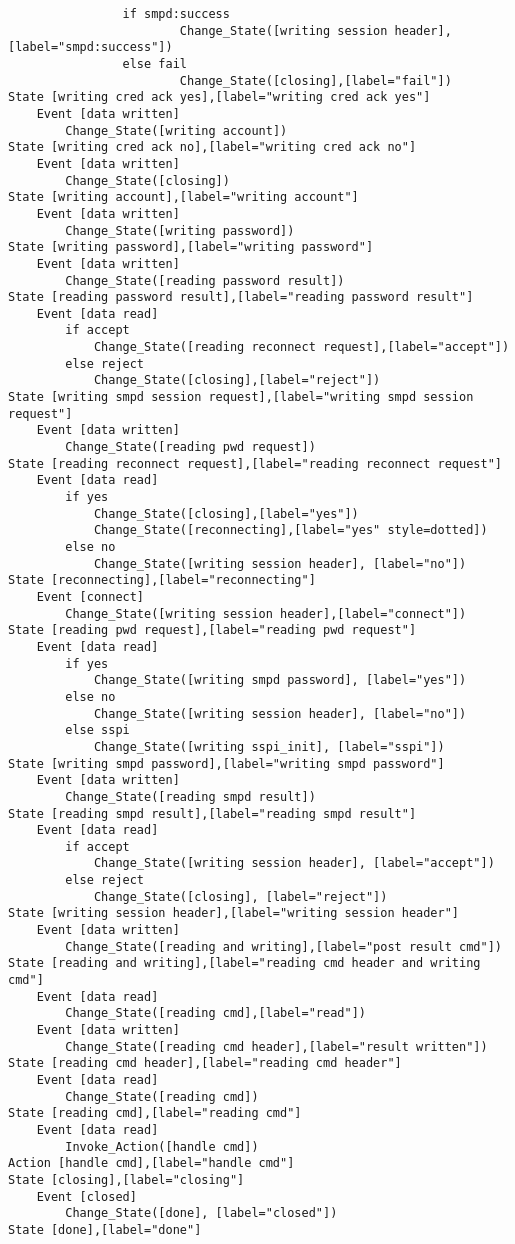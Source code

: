 \begin{verbatim}
                if smpd:success
						Change_State([writing session header],[label="smpd:success"])
                else fail
                        Change_State([closing],[label="fail"])
State [writing cred ack yes],[label="writing cred ack yes"]
	Event [data written]
		Change_State([writing account])
State [writing cred ack no],[label="writing cred ack no"]
	Event [data written]
		Change_State([closing])
State [writing account],[label="writing account"]
	Event [data written]
		Change_State([writing password])
State [writing password],[label="writing password"]
	Event [data written]
		Change_State([reading password result])
State [reading password result],[label="reading password result"]
	Event [data read]
		if accept
			Change_State([reading reconnect request],[label="accept"])
		else reject
			Change_State([closing],[label="reject"])
State [writing smpd session request],[label="writing smpd session request"]
	Event [data written]
		Change_State([reading pwd request])
State [reading reconnect request],[label="reading reconnect request"]
	Event [data read]
		if yes
			Change_State([closing],[label="yes"])
			Change_State([reconnecting],[label="yes" style=dotted])
		else no
			Change_State([writing session header], [label="no"])
State [reconnecting],[label="reconnecting"]
	Event [connect]
		Change_State([writing session header],[label="connect"])
State [reading pwd request],[label="reading pwd request"]
	Event [data read]
		if yes
			Change_State([writing smpd password], [label="yes"])
		else no
			Change_State([writing session header], [label="no"])
		else sspi
			Change_State([writing sspi_init], [label="sspi"])
State [writing smpd password],[label="writing smpd password"]
	Event [data written]
		Change_State([reading smpd result])
State [reading smpd result],[label="reading smpd result"]
	Event [data read]
		if accept
			Change_State([writing session header], [label="accept"])
		else reject
			Change_State([closing], [label="reject"])
State [writing session header],[label="writing session header"]
	Event [data written]
		Change_State([reading and writing],[label="post result cmd"])
State [reading and writing],[label="reading cmd header and writing cmd"]
	Event [data read]
		Change_State([reading cmd],[label="read"])
	Event [data written]
		Change_State([reading cmd header],[label="result written"])
State [reading cmd header],[label="reading cmd header"]
	Event [data read]
		Change_State([reading cmd])
State [reading cmd],[label="reading cmd"]
	Event [data read]
		Invoke_Action([handle cmd])
Action [handle cmd],[label="handle cmd"]
State [closing],[label="closing"]
	Event [closed]
		Change_State([done], [label="closed"])
State [done],[label="done"]
\end{verbatim}

